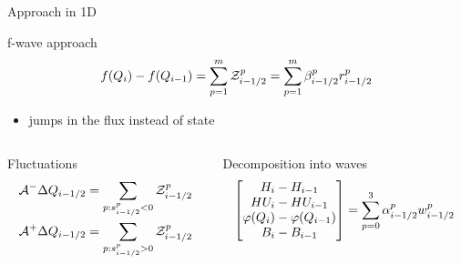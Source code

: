 \documentclass[xcolor=dvipsnames]{beamer}
\begin{document}
\begin{frame}[label=sec-4-4]{Approach in 1D}
\begin{block}{f-wave approach}
\begin{equation*}
f(Q_i) -f(Q_{i-1}) = \sum_{p=1}^m {\cal Z}_{i-1/2}^p = \sum_{p=1}^m \beta^p_{i-1/2}r^p_{i-1/2}
\end{equation*}
\begin{itemize}
\item jumps in the flux instead of state
\end{itemize}
\end{block}

\begin{columns}
\begin{column}{0.4\textwidth}
\begin{block}{Fluctuations}
\begin{equation*}
\begin{align}
{\cal A}^-\Delta Q_{i-1/2} &= \sum_{p:s^p_{i-1/2}<0} {\cal Z}_{i-1/2}^p \\
{\cal A}^+\Delta Q_{i-1/2} &= \sum_{p:s^p_{i-1/2}>0} {\cal Z}_{i-1/2}^p  
\end{align}
\end{equation*}
\end{block}
\end{column}

\begin{column}{0.5\textwidth}
\begin{block}{Decomposition into waves}
\begin{equation*}
\begin{bmatrix}
H_i - H_{i-1}\\
HU_i - HU_{i-1}\\
\varphi(Q_i) - \varphi(Q_{i-1}) \\
B_i - B_{i-1}\\
\end{bmatrix}
= \sum_{p=0}^3 \alpha^p_{i-1/2}w^p_{i-1/2}
\end{equation*}
\end{block}
\end{column}
\end{columns}
\end{frame}
\end{document}
